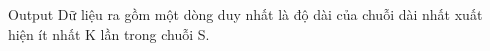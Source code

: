 Output
Dữ liệu ra gồm một dòng duy nhất là độ dài của chuỗi dài nhất xuất hiện ít nhất K lần trong chuỗi S.